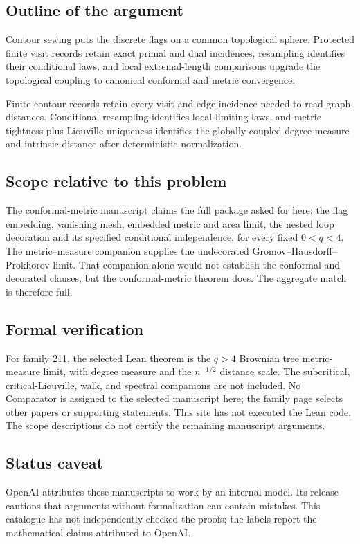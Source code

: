 \documentclass[11pt]{article}
\begin{document}
\subsection{Outline of the argument}
Contour sewing puts the discrete flags on a common topological sphere. Protected finite visit records retain exact primal and dual incidences, resampling identifies their conditional laws, and local extremal-length comparisons upgrade the topological coupling to canonical conformal and metric convergence.

Finite contour records retain every visit and edge incidence needed to read graph distances. Conditional resampling identifies local limiting laws, and metric tightness plus Liouville uniqueness identifies the globally coupled degree measure and intrinsic distance after deterministic normalization.

\subsection{Scope relative to this problem}
The conformal-metric manuscript claims the full package asked for here: the flag embedding, vanishing mesh, embedded metric and area limit, the nested loop decoration and its specified conditional independence, for every fixed $0<q<4$. The metric--measure companion supplies the undecorated Gromov--Hausdorff--Prokhorov limit. That companion alone would not establish the conformal and decorated clauses, but the conformal-metric theorem does. The aggregate match is therefore full.

\subsection{Formal verification}
For family 211, the selected Lean theorem is the $q>4$ Brownian tree metric-measure limit, with degree measure and the $n^{-1/2}$ distance scale. The subcritical, critical-Liouville, walk, and spectral companions are not included. No Comparator is assigned to the selected manuscript here; the family page selects other papers or supporting statements. This site has not executed the Lean code. The scope descriptions do not certify the remaining manuscript arguments.

\subsection{Status caveat}
OpenAI attributes these manuscripts to work by an internal model. Its release cautions that arguments without formalization can contain mistakes. This catalogue has not independently checked the proofs; the labels report the mathematical claims attributed to OpenAI.
\end{document}
